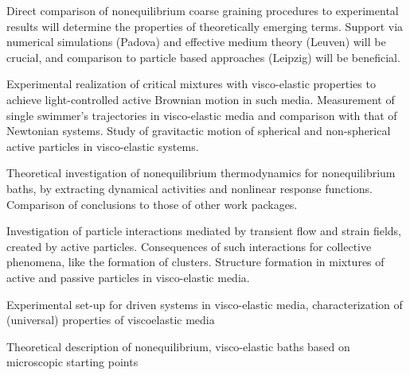\begin{workpackage}
\begin{tasklist}
\begin{task}[title=Theoretical identification of nonequilibrium signatures of the bath,id=brown-t3,PM=24,lead=USTUTT,wphases=0-24!1.0,partners={KUL,UNIPD,ULEI}]
Direct comparison of nonequilibrium coarse graining procedures to experimental results will
determine the properties of theoretically emerging terms. Support via numerical simulations
(Padova) and effective medium theory (Leuven) will be crucial, and comparison to particle
based approaches (Leipzig) will be beneficial.
\end{task}

\begin{task}[title=Self-propelled particles in visco-elastic baths,id=brown-t4,PM=24,lead=USTUTT,wphases=24-48!0.5]
Experimental realization of critical mixtures with visco-elastic properties to achieve light-controlled active Brownian motion in such media. Measurement of single swimmer's trajectories in visco-elastic media and comparison with that of Newtonian systems. Study of gravitactic motion of spherical and non-spherical active particles in visco-elastic systems. 
\end{task}
\begin{task}[title=Nonequilbrium thermodynamics,id=brown-t5,PM=24,lead=USTUTT,wphases=24-48!1.0,partners={KUL,UNIPD,ULEI}]
Theoretical investigation of nonequilibrium thermodynamics for nonequilibrium baths, by
extracting dynamical activities and nonlinear response functions. Comparison of conclusions
to those of other work packages.
\end{task}

\begin{task}[title=Collective behavior of self-propelled particles in visco-elastic baths,id=brown-t6,PM=24,lead=USTUTT,wphases=24-48!0.5]
Investigation of particle interactions mediated by transient flow and strain fields, created by active particles. Consequences of such interactions for collective phenomena, like the formation of clusters. Structure formation in mixtures of active and passive particles in visco-elastic media.  
\end{task}


\end{tasklist}

\begin{wpdelivs}
  \begin{wpdeliv}[due=24,id=brown-d1,dissem=PU,nature=DEM,lead=USTUTT,miles=data1]
      {Experimental set-up for driven systems in visco-elastic media, characterization of (universal) properties of viscoelastic media}
  \end{wpdeliv}
  \begin{wpdeliv}[due=24,id=brown-d2,dissem=PU,nature=DEM,lead=USTUTT,miles=data1]
      {Theoretical description of nonequilibrium, visco-elastic baths based on microscopic starting points}
\end{wpdeliv}
 

\end{wpdelivs}
\end{workpackage}
